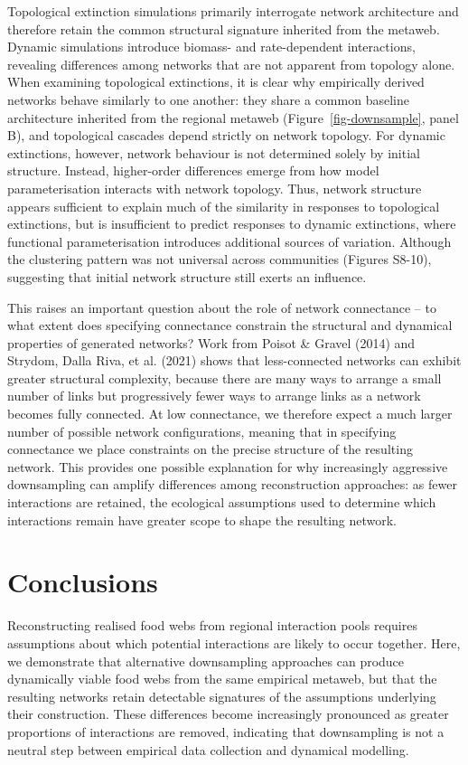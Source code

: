 \documentclass[
]{article}
\begin{document}
Topological extinction simulations primarily interrogate network
architecture and therefore retain the common structural signature
inherited from the metaweb. Dynamic simulations introduce biomass- and
rate-dependent interactions, revealing differences among networks that
are not apparent from topology alone. When examining topological
extinctions, it is clear why empirically derived networks behave
similarly to one another: they share a common baseline architecture
inherited from the regional metaweb (Figure~\ref{fig-downsample}, panel
B), and topological cascades depend strictly on network topology. For
dynamic extinctions, however, network behaviour is not determined solely
by initial structure. Instead, higher-order differences emerge from how
model parameterisation interacts with network topology. Thus, network
structure appears sufficient to explain much of the similarity in
responses to topological extinctions, but is insufficient to predict
responses to dynamic extinctions, where functional parameterisation
introduces additional sources of variation. Although the clustering
pattern was not universal across communities (Figures S8-10), suggesting
that initial network structure still exerts an influence.

This raises an important question about the role of network connectance
-- to what extent does specifying connectance constrain the structural
and dynamical properties of generated networks? Work from Poisot \&
Gravel (2014) and Strydom, Dalla Riva, et al. (2021) shows that
less-connected networks can exhibit greater structural complexity,
because there are many ways to arrange a small number of links but
progressively fewer ways to arrange links as a network becomes fully
connected. At low connectance, we therefore expect a much larger number
of possible network configurations, meaning that in specifying
connectance we place constraints on the precise structure of the
resulting network. This provides one possible explanation for why
increasingly aggressive downsampling can amplify differences among
reconstruction approaches: as fewer interactions are retained, the
ecological assumptions used to determine which interactions remain have
greater scope to shape the resulting network.

\section{Conclusions}\label{conclusions}

Reconstructing realised food webs from regional interaction pools
requires assumptions about which potential interactions are likely to
occur together. Here, we demonstrate that alternative downsampling
approaches can produce dynamically viable food webs from the same
empirical metaweb, but that the resulting networks retain detectable
signatures of the assumptions underlying their construction. These
differences become increasingly pronounced as greater proportions of
interactions are removed, indicating that downsampling is not a neutral
step between empirical data collection and dynamical modelling.
\end{document}
